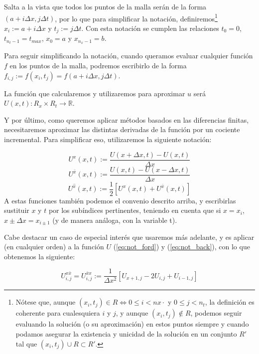 Salta a la vista que todos los puntos de la malla serán de la forma $(a+i\Delta x,j\Delta t)$, por lo que para simplificar la notación, definiremos\footnote{Nótese que, aunque $(x_i,t_j)\in R \Leftrightarrow 0\leq i< nx·$ y $0\leq j<n_t$, la definición es coherente para cualesquiera $i$ y $j$, y aunque $(x_i,t_j)\notin R$, podemos seguir evaluando la solución (o su aproximación) en estos puntos siempre y cuando podamos asegurar la existencia y unicidad de la solución en un conjunto $R'$ tal que $(x_i,t_j)\cup R\subset R'$.} $x_i:=a+i\Delta x$ y $t_j:=j\Delta t$. Con esta notación se cumplen las relaciones $t_0=0$, $t_{n_t-1}=t_{max}$, $x_0=a$ y $x_{n_x-1}=b$.

Para seguir simplificando la notación, cuando queramos evaluar cualquier función $f$ en los puntos de la malla, podremos escribirlo de la forma $f_{i,j}:=f(x_i,t_j)=f(a+i\Delta x,j\Delta t)$.

La función que calcularemos y utilizaremos para aproximar $u$ será $U(x,t):R_x\times R_t\longrightarrow \mathbb{R}$.

Y por último, como queremos aplicar métodos basados en las diferencias finitas, necesitaremos aproximar las distintas derivadas de la función por un cociente incremental. Para simplificar eso, utilizaremos la siguiente notación:

\begin{equation}
	\label{eq:not_ford}
	U^{x}(x,t) := \frac{U(x+\Delta x,t)-U(x,t)}{\Delta x}
\end{equation}
\begin{equation}
	\label{eq:not_back}
	U^{\bar{x}}(x,t) := \frac{U(x,t)-U(x-\Delta x,t)}{\Delta x}
\end{equation}
\begin{equation}
	\label{eq:not_center}
	U^{\hat{x}}(x,t):= \frac{1}{2}[U^{x}(x,t)+U^{\bar{x}}(x,t)]
\end{equation}
A estas funciones también podemos el convenio descrito arriba, y escribirlas sustituir $x$ y $t$ por los subíndices pertinentes, teniendo en cuenta que si $x = x_i$, $x \pm \Delta x = x_{i\pm1}$ (y de manera análoga, con la variable t).

Cabe destacar un caso de especial interés que usaremos más adelante, y es aplicar (en cualquier orden) a la función $U$ (\ref{eq:not_ford}) y (\ref{eq:not_back}), con lo que obtenemos la siguiente:


\begin{equation}
	\label{eq:not_second}
	U^{x\bar{x}}_{i,j} = U^{\bar{x}x}_{i,j} := \frac{1}{\Delta x^2}[U_{x+1,j} - 2U_{i,j}+U_{i-1,j}]
\end{equation}

